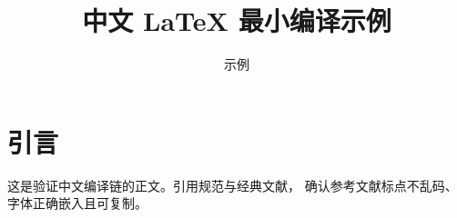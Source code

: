 \documentclass[a4paper,UTF8]{ctexart}
\title{中文 LaTeX 最小编译示例}
\author{示例}
\date{}
\begin{document}
\maketitle

\section{引言}
这是验证中文编译链的正文。引用规范\cite{jtgd50}与经典文献\cite{roscoe1968}，
确认参考文献标点不乱码、字体正确嵌入且可复制。

\printbibliography[heading=none]
\end{document}
